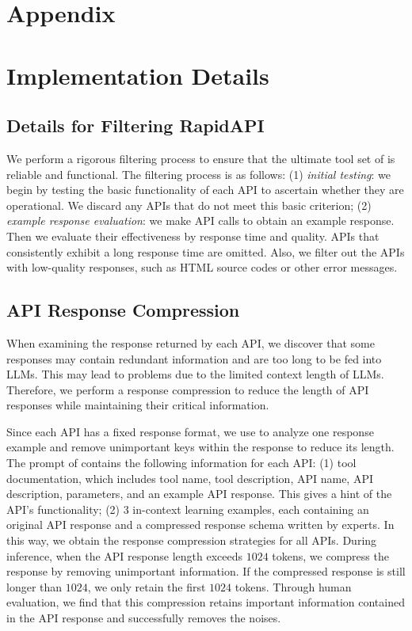 \clearpage
\appendix
\section*{Appendix}

\section{Implementation Details}

\subsection{Details for Filtering RapidAPI}
\label{sec:detail_filtering_api}
We perform a rigorous filtering process to ensure that the ultimate tool set of \ourdata is reliable and functional.
The filtering process is as follows: (1) \textit{initial testing}: we begin by testing the basic functionality of each API to ascertain whether they are operational. We discard any APIs that do not meet this basic criterion; 
(2) \textit{example response evaluation}: we make API calls to obtain an example response. Then we evaluate their effectiveness by response time and quality. APIs that consistently exhibit a long response time are omitted. Also, we filter out the APIs with low-quality responses, such as HTML source codes or other error messages.

\subsection{API Response Compression}
When examining the response returned by each API, we discover that some responses may contain redundant information and are too long to be fed into LLMs. This may lead to problems due to the limited context length of LLMs.
Therefore, we perform a response compression to reduce the length of API responses while maintaining their critical information.

Since each API has a fixed response format, we use \turbo to analyze one response example and remove unimportant keys within the response to reduce its length. The prompt of \turbo contains the following information for each API: (1) tool documentation, which includes tool name, tool description, API name, API description, parameters, and an example API response. This gives \turbo a hint of the API’s functionality; (2) $3$ in-context learning examples, each containing an original API response and a compressed response schema written by experts.
In this way, we obtain the response compression strategies for all APIs.
During inference, when the API response length exceeds $1024$ tokens, we compress the response by removing unimportant information. If the compressed response is still longer than $1024$, we only retain the first $1024$ tokens. Through human evaluation, we find that this compression retains important information contained in the API response and successfully removes the noises.

